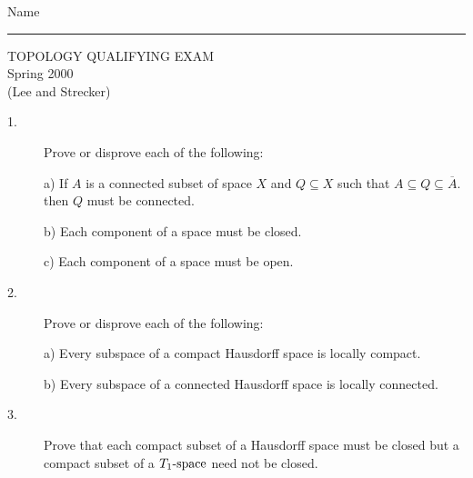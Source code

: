 \documentclass[bbb]{report}
\begin{document}

\begin{Large}

\hfill Name \rule{2.5in}{.01in}
\par
\vspace{.1in}

\begin{center}
   TOPOLOGY QUALIFYING EXAM \\
  Spring 2000 \\
   (Lee and Strecker) \\
\end{center}


\vspace{.1in}


\vspace{.2in}

\begin{description}

\item[1.]
Prove or disprove each of the following:

\item[\quad] a)
If $A$ is a connected subset of space $X$ and $Q\subseteq X$
such that $A\subseteq Q\subseteq \overline{A}$.
then $Q$ must be connected.

\item[\quad] b)
Each component of a space must be closed.

\item[\quad] c)
Each component of a space must be open.



\item[2.]
Prove or disprove each of the following:

\item[\quad] a)
Every subspace of a compact Hausdorff space is locally compact.

\item[\quad] b)
Every subspace of a connected Hausdorff space is locally connected.



\item[3.]
Prove that each compact subset of a Hausdorff space must be closed but a
compact subset of a $T_1\hbox{-space}$ need not be closed.


\end{description}
\end{Large}
\end{document}
